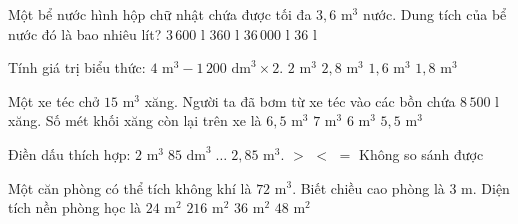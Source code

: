 \begin{ex} %
Một bể nước hình hộp chữ nhật chứa được tối đa $3{,}6\text{ m}^3$ nước. Dung tích của bể nước đó là bao nhiêu lít?
\choice
{\True $3\,600\text{ l}$}
{$360\text{ l}$}
{$36\,000\text{ l}$}
{$36\text{ l}$}
\end{ex}

\begin{ex} %
Tính giá trị biểu thức: $4\text{ m}^3 - 1\,200\text{ dm}^3 \times 2$.
\choice
{$2\text{ m}^3$}
{$2{,}8\text{ m}^3$}
{\True $1{,}6\text{ m}^3$}
{$1{,}8\text{ m}^3$}
\end{ex}

\begin{ex} %
Một xe téc chở $15\text{ m}^3$ xăng. Người ta đã bơm từ xe téc vào các bồn chứa $8\,500\text{ l}$ xăng. Số mét khối xăng còn lại trên xe là
\choice
{\True $6{,}5\text{ m}^3$}
{$7\text{ m}^3$}
{$6\text{ m}^3$}
{$5{,}5\text{ m}^3$}
\end{ex}

\begin{ex} %
Điền dấu thích hợp: $2\text{ m}^3\; 85\text{ dm}^3 \;\dots\; 2{,}85\text{ m}^3$.
\choice
{$>$}
{\True $<$}
{$=$}
{Không so sánh được}
\end{ex}

\begin{ex} %
Một căn phòng có thể tích không khí là $72\text{ m}^3$. Biết chiều cao phòng là $3\text{ m}$. Diện tích nền phòng học là
\choice
{\True $24\text{ m}^2$}
{$216\text{ m}^2$}
{$36\text{ m}^2$}
{$48\text{ m}^2$}
\end{ex}

